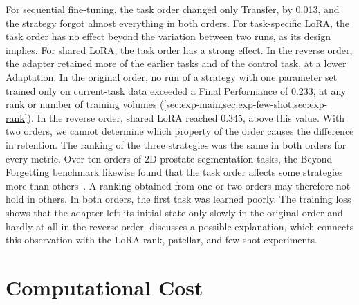 For sequential fine-tuning, the task order changed only Transfer, by 0.013, and the strategy forgot almost everything in both orders.
For task-specific LoRA, the task order has no effect beyond the variation between two runs, as its design implies.
For shared LoRA, the task order has a strong effect.
In the reverse order, the adapter retained more of the earlier tasks and of the control task, at a lower Adaptation.
In the original order, no run of a strategy with one parameter set trained only on current-task data exceeded a Final Performance of 0.233, at any rank or number of training volumes (\cref{sec:exp-main,sec:exp-few-shot,sec:exp-rank}).
In the reverse order, shared LoRA reached 0.345, above this value.
With two orders, we cannot determine which property of the order causes the difference in retention.
The ranking of the three strategies was the same in both orders for every metric.
Over ten orders of 2D prostate segmentation tasks, the Beyond Forgetting benchmark likewise found that the task order affects some strategies more than others~\cite[Sec.~4.4]{wang2026beyondforgetting}.
A ranking obtained from one or two orders may therefore not hold in others.
In both orders, the first task was learned poorly.
The training loss shows that the adapter left its initial state only slowly in the original order and hardly at all in the reverse order.
 discusses a possible explanation, which connects this observation with the LoRA rank, patellar, and few-shot experiments.

\section{Computational Cost}
\label{sec:exp-compute}

